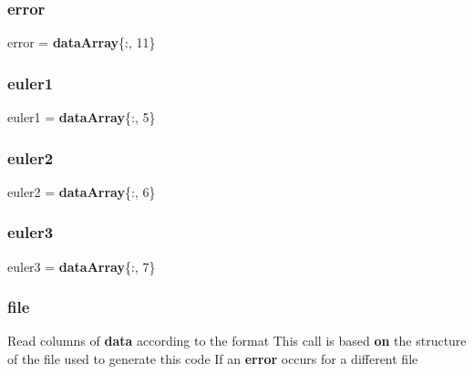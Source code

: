 \mbox{\label{_import_log_8m_af10dacfa214e2575bb2e0ee407c242e0}} 
\subsubsection{error}
{\footnotesize\ttfamily error = \textbf{ data\+Array}\{\+:, 11\}}

\mbox{\label{_import_log_8m_a9c379f8fe46ea91c796737efba5d2ec6}} 
\subsubsection{euler1}
{\footnotesize\ttfamily euler1 = \textbf{ data\+Array}\{\+:, 5\}}

\mbox{\label{_import_log_8m_a3ffff58fff46af66637f36991d84d5d0}} 
\subsubsection{euler2}
{\footnotesize\ttfamily euler2 = \textbf{ data\+Array}\{\+:, 6\}}

\mbox{\label{_import_log_8m_a395788df378abd76468028014ddba1ea}} 
\subsubsection{euler3}
{\footnotesize\ttfamily euler3 = \textbf{ data\+Array}\{\+:, 7\}}

\mbox{\label{_import_log_8m_a2524525e499f4ee63bb0c6dd166f745d}} 
\subsubsection{file}
{\footnotesize\ttfamily Read columns of \textbf{ data} according to the format This call is based \textbf{ on} the structure of the file used to generate this code If an \textbf{ error} occurs for a different file}

\mbox{\label{_import_log_8m_a0535e16c4a03a88fd449c86dc20c47c4}} 
